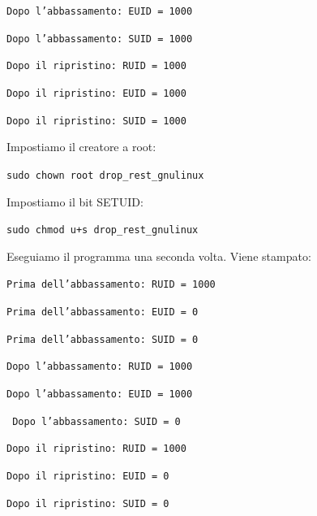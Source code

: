 \texttt{Dopo l’abbassamento: EUID = 1000}

\texttt{Dopo l’abbassamento: SUID = 1000}

\texttt{Dopo il ripristino: RUID = 1000 }

\texttt{Dopo il ripristino: EUID = 1000}

\texttt{Dopo il ripristino: SUID = 1000}

Impostiamo il creatore a root:
\begin{center}
    \texttt{sudo chown root drop\_rest\_gnulinux}
\end{center}
Impostiamo il bit SETUID:
\begin{center}
    \texttt{sudo chmod u+s drop\_rest\_gnulinux}
\end{center}
Eseguiamo il programma una seconda volta. Viene stampato:

\texttt{Prima dell’abbassamento: RUID = 1000}

\texttt{Prima dell’abbassamento: EUID = 0}

\texttt{Prima dell’abbassamento: SUID = 0}

\texttt{Dopo l’abbassamento: RUID = 1000}

\texttt{Dopo l’abbassamento: EUID = 1000}

\texttt{ Dopo l’abbassamento: SUID = 0}

\texttt{Dopo il ripristino: RUID = 1000}

\texttt{Dopo il ripristino: EUID = 0}

\texttt{Dopo il ripristino: SUID = 0}


\let\cleardoublepage\clearpage
